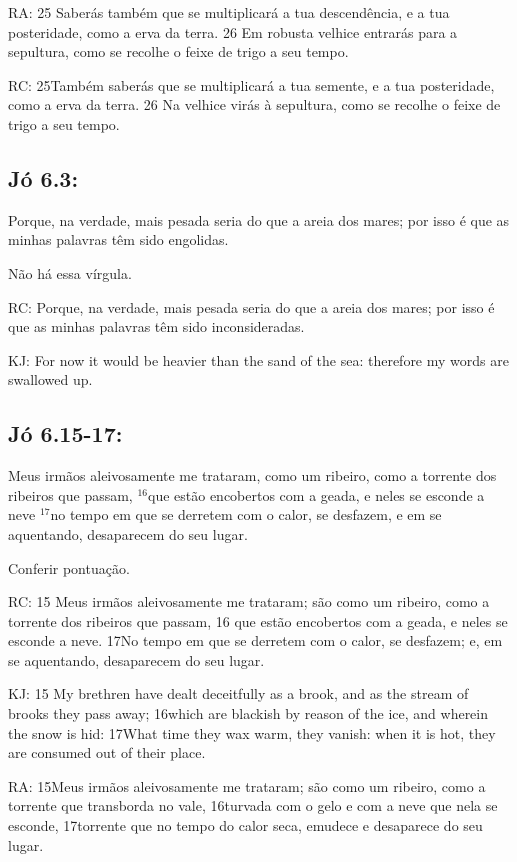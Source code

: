 RA: 25 Saberás também que se multiplicará a tua descendência, e a tua posteridade, como a erva da terra. 26 Em robusta velhice entrarás para a sepultura, como se recolhe o feixe de trigo a seu tempo.

RC: 25Também saberás que se multiplicará a tua semente, e a tua posteridade, como a erva da terra. 26 Na velhice virás à sepultura, como se recolhe o feixe de trigo a seu tempo.

\subsection{Jó 6.3:}

 Porque, na verdade, mais pesada seria\uwave{,} do que a areia dos mares; por isso é que as minhas palavras têm sido engolidas.

Não há essa vírgula.

RC: Porque, na verdade, mais pesada seria do que a areia dos mares; por isso é que as minhas palavras têm sido inconsideradas.

KJ: For now it would be heavier than the sand of the sea: therefore my words are swallowed up.

\subsection{Jó 6.15-17:}

 Meus irmãos aleivosamente me trataram, como um ribeiro, como a torrente dos ribeiros que passam, $^{\mathrm{16}}$que estão encobertos com a geada, e neles se esconde a neve\uwave{,} $^{\mathrm{17}}$no tempo em que se derretem com o calor, se desfazem, e em se aquentando, desaparecem do seu lugar.

Conferir pontuação.

RC: 15 Meus irmãos aleivosamente me trataram; são como um ribeiro, como a torrente dos ribeiros que passam, 16 que estão encobertos com a geada, e neles se esconde a neve. 17No tempo em que se derretem com o calor, se desfazem; e, em se aquentando, desaparecem do seu lugar.

KJ: 15 My brethren have dealt deceitfully as a brook, and as the stream of brooks they pass away; 16which are blackish by reason of the ice, and wherein the snow is hid: 17What time they wax warm, they vanish: when it is hot, they are consumed out of their place.

RA: 15Meus irmãos aleivosamente me trataram; são como um ribeiro, como a torrente que transborda no vale, 16turvada com o gelo e com a neve que nela se esconde, 17torrente que no tempo do calor seca, emudece e desaparece do seu lugar.

